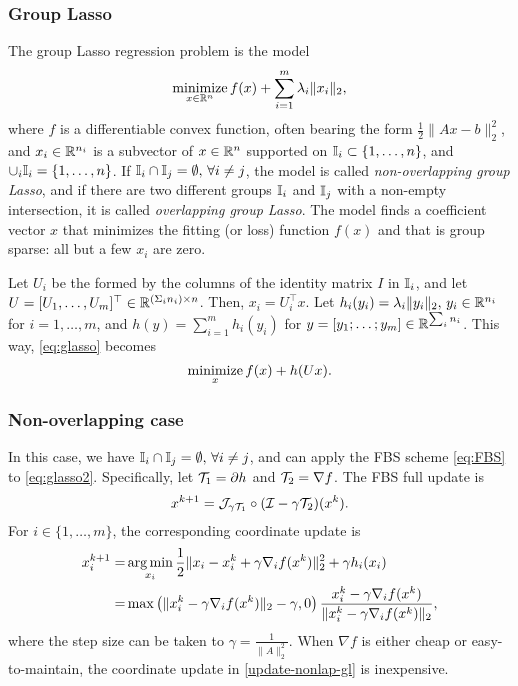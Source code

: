 \subsubsection{Group Lasso}\label{sec:glasso}
The group Lasso   regression problem \cite{YL2006GrpLasso} is the model
\begin{equation}\label{eq:glasso}
\Min_{x\in\RR^n}  f(x)+\sum_{i=1}^m\lambda_i\|x_i\|_2,
\end{equation} 
where $ f$ is a differentiable convex function, often bearing the form $\frac{1}{2}\|Ax-b\|_2^2$, and $x_i\in \mathbb{R}^{n_i}$ is a subvector of $x\in\mathbb{R}^n$ supported on $\mathbb{I}_i\subset \{1,\dots,n\}$, and $\cup_i \mathbb{I}_i=\{1,\dots,n\}$. If $\mathbb{I}_i\cap \mathbb{I}_j =\emptyset, \,\forall i\neq j$, the model is called \emph{non-overlapping group Lasso}, and if there are two different groups $\mathbb{I}_i$ and $\mathbb{I}_j$ with a non-empty intersection, it is called \emph{overlapping group Lasso}. The model finds a coefficient vector $x$ that minimizes the fitting (or loss) function $f(x)$ and that is group sparse: all but a few $x_i$ are zero.  

Let $U_i$ be the formed by the columns of the identity matrix $I$ in $\mathbb{I}_i$, and let $U=[U_1,\ldots,U_m]^\top\in\mathbb{R}^{(\Sigma_i n_i)\times n}$. Then, $x_i=U_i^\top x$. Let $h_i(y_i)=\lambda_i\|y_i\|_2,\,y_i\in\mathbb{R}^{n_i}$ for $i=1,\ldots,m$, and $h(y)=\sum_{i=1}^m h_i(y_i)$ for $y=[y_1;\ldots;y_m]\in\mathbb{R}^{\sum_i n_i}$. This way, \eqref{eq:glasso} becomes
\begin{equation}\label{eq:glasso2}
\Min_x f(x)+h(Ux).
\end{equation}

\subsubsection*{Non-overlapping case} In this case, we have $\mathbb{I}_i\cap \mathbb{I}_j =\emptyset, \,\forall i\neq j$, and can apply the FBS scheme \eqref{eq:FBS} to \eqref{eq:glasso2}. Specifically, let ${\mathcal{T}}_1=\partial h$ and ${\mathcal{T}}_2=\nabla f$. The FBS full update is 
$$x^{k+1}={\mathcal{J}}_{\gamma {\mathcal{T}}_1}\circ({\mathcal{I}}-\gamma{\mathcal{T}}_2)(x^k).$$
For $i\in\{1,\ldots,m\}$, the corresponding coordinate update is
\begin{subequations}\label{update-nonlap-gl}
\begin{align}
x_i^{k+1}=&\argmin_{x_i}\frac{1}{2}\|x_i-x_i^k+\gamma \nabla_i f(x^k)\|_2^2+ \gamma h_i(x_i)\\
=&\max\left(\|x_i^k-\gamma \nabla_i f(x^k)\|_2-\gamma,0\right)\frac{x_i^k-\gamma \nabla_i f(x^k)}{\|x_i^k-\gamma \nabla_i f(x^k)\|_2},
\end{align} 
\end{subequations}
where the step size can be taken to $\gamma=\frac{1}{\|A\|_2^2}$. When $\nabla f$ is either cheap or easy-to-maintain,  the coordinate update in \eqref{update-nonlap-gl} is inexpensive.

